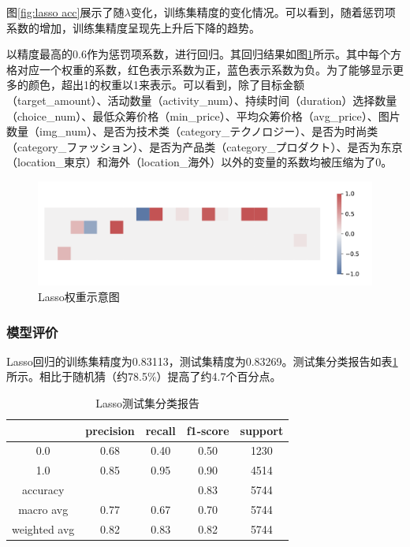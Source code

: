 \documentclass[lang=cn,a4paper]{elegantpaper}
\begin{document}
图\ref{fig:lasso acc}展示了随$\lambda$变化，训练集精度的变化情况。可以看到，随着惩罚项系数的增加，训练集精度呈现先上升后下降的趋势。

以精度最高的0.6作为惩罚项系数，进行回归。其回归结果如图\ref{fig:lassocoef}所示。其中每个方格对应一个权重的系数，红色表示系数为正，蓝色表示系数为负。为了能够显示更多的颜色，超出1的权重以1来表示。可以看到，除了目标金额（target\_amount）、活动数量（activity\_num）、持续时间（duration）选择数量（choice\_num）、最低众筹价格（min\_price）、平均众筹价格（avg\_price）、图片数量（img\_num）、是否为技术类（category\_テクノロジー）、是否为时尚类（category\_ファッション）、是否为产品类（category\_プロダクト）、是否为东京（location\_東京）和海外（location\_海外）以外的变量的系数均被压缩为了0。

\begin{figure}[!h]
  \centering
  \includegraphics[width=\linewidth]{image/lasso.pdf}
  \caption{Lasso权重示意图}
  \label{fig:lassocoef}
\end{figure}


\subsubsection{模型评价}
Lasso回归的训练集精度为0.83113，测试集精度为0.83269。测试集分类报告如表\ref{tbl:lasso1}所示。相比于随机猜（约78.5\%）提高了约4.7个百分点。
\begin{table}[!htbp]
  \centering
  \caption{Lasso测试集分类报告}
  \begin{tabular}{ccccc}
    \toprule
    &precision&recall&f1-score&support\\
    \midrule
    0.0& 0.68&0.40&0.50&1230\\
    1.0& 0.85&0.95&0.90&4514\\
    accuracy&&&0.83&5744\\
   macro avg& 0.77&0.67&0.70&5744\\
weighted avg& 0.82&0.83&0.82&5744\\
    \bottomrule
  \end{tabular}
  \label{tbl:lasso1}
\end{table}
\end{document}
